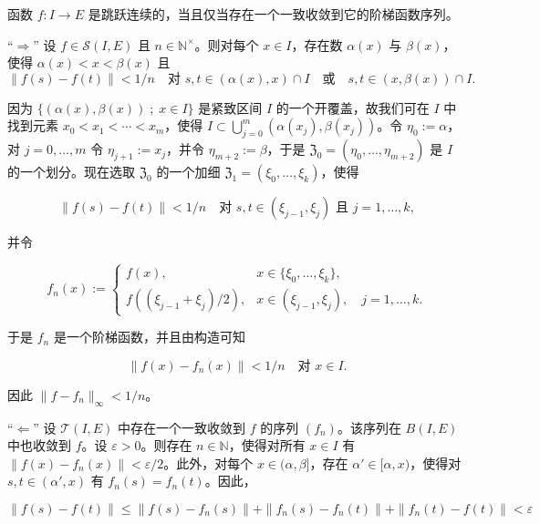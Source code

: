 \begin{theorem}

函数 $ f : I \to E $ 是跳跃连续的，当且仅当存在一个一致收敛到它的阶梯函数序列。

\proofhead
“$ \Longrightarrow $” 设 $ f \in \mathcal{S}(I, E) $ 且 $ n \in \mathbb{N}^\times $。则对每个 $ x \in I $，存在数 $ \alpha(x) $ 与 $ \beta(x) $，使得 $ \alpha(x) < x < \beta(x) $ 且
\[
\|f(s) - f(t)\| < 1/n \quad \text{对 } s, t \in (\alpha(x), x) \cap I \quad \text{或} \quad s, t \in (x, \beta(x)) \cap I.
\]

因为 $ \{(\alpha(x), \beta(x)) \;;\; x \in I\} $ 是紧致区间 $ I $ 的一个开覆盖，故我们可在 $ I $ 中找到元素 $ x_0 < x_1 < \cdots < x_m $，使得 $ I \subset \bigcup_{j=0}^{m} (\alpha(x_j), \beta(x_j)) $。令 $ \eta_0 := \alpha $，对 $ j = 0, \ldots, m $ 令 $ \eta_{j+1} := x_j $，并令 $ \eta_{m+2} := \beta $，于是 $ \mathfrak{Z}_0 = (\eta_0, \ldots, \eta_{m+2}) $ 是 $ I $ 的一个划分。现在选取 $ \mathfrak{Z}_0 $ 的一个加细 $ \mathfrak{Z}_1 = (\xi_0, \ldots, \xi_k) $，使得

\[
\|f(s) - f(t)\| < 1/n \quad \text{对 } s, t \in (\xi_{j-1}, \xi_j) \text{ 且 } j = 1, \ldots, k,
\]

并令

\begin{equation*}
f_n(x) := \begin{cases} f(x), & x \in \{\xi_0, \ldots, \xi_k\}, \\ f((\xi_{j-1} + \xi_j)/2), & x \in (\xi_{j-1}, \xi_j), \quad j = 1, \ldots, k. \end{cases}
\end{equation*}

于是 $ f_n $ 是一个阶梯函数，并且由构造可知

\[
\|f(x) - f_n(x)\| < 1/n \quad \text{对 } x \in I.
\]

因此 $ \|f - f_n\|_\infty < 1/n $。

“$ \Longleftarrow $” 设 $ \mathcal{T}(I, E) $ 中存在一个一致收敛到 $ f $ 的序列 $ (f_n) $。该序列在 $ B(I, E) $ 中也收敛到 $ f $。设 $ \varepsilon > 0 $。则存在 $ n \in \mathbb{N} $，使得对所有 $ x \in I $ 有 $ \|f(x) - f_n(x)\| < \varepsilon/2 $。此外，对每个 $ x \in (\alpha, \beta] $，存在 $ \alpha' \in [\alpha, x) $，使得对 $ s, t \in (\alpha', x) $ 有 $ f_n(s) = f_n(t) $。因此，

\begin{equation}
\|f(s) - f(t)\| \le \|f(s) - f_n(s)\| + \|f_n(s) - f_n(t)\| + \|f_n(t) - f(t)\| < \varepsilon\tag{1.2}
\end{equation}


\end{theorem}

